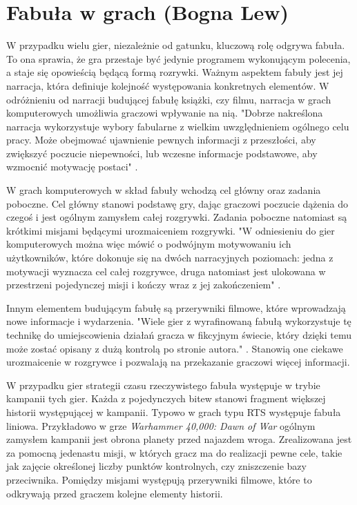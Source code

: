 \section{Fabuła w grach (Bogna Lew)}\label{s:fabula}
W przypadku wielu gier, niezależnie od gatunku, kluczową rolę odgrywa fabuła. To ona sprawia, że gra przestaje być
jedynie programem wykonującym polecenia, a staje się opowieścią będącą formą rozrywki. Ważnym aspektem fabuły jest jej
narracja, która definiuje kolejność występowania konkretnych elementów. W odróżnieniu od narracji budującej
fabułę książki, czy filmu, narracja w grach komputerowych umożliwia graczowi wpływanie na nią. "Dobrze nakreślona
narracja wykorzystuje wybory fabularne z wielkim uwzględnieniem ogólnego celu pracy. Może obejmować ujawnienie pewnych
informacji z przeszłości, aby zwiększyć poczucie niepewności, lub wczesne informacje podstawowe, aby wzmocnić motywację
postaci" \cite{level_design}.

W grach komputerowych w skład fabuły wchodzą cel główny oraz zadania poboczne. Cel główny stanowi podstawę gry, dając
graczowi poczucie dążenia do czegoś i jest ogólnym zamysłem całej rozgrywki. Zadania poboczne natomiast są krótkimi
misjami będącymi urozmaiceniem rozgrywki. "W odniesieniu do gier komputerowych można więc mówić o podwójnym motywowaniu
ich użytkowników, które dokonuje się na dwóch narracyjnych poziomach: jedna z motywacji wyznacza cel całej
rozgrywce, druga natomiast jest ulokowana w przestrzeni pojedynczej misji i kończy wraz z jej zakończeniem" \cite{olbrzymwcieniu}.

Innym elementem budującym fabułę są przerywniki filmowe, które wprowadzają nowe informacje i wydarzenia. "Wiele gier z
wyrafinowaną fabułą wykorzystuje tę technikę do umiejscowienia działań gracza w fikcyjnym świecie, który dzięki temu
może zostać opisany z dużą kontrolą po stronie autora." \cite{understanding_games}. Stanowią one ciekawe urozmaicenie w rozgrywce i
pozwalają na przekazanie graczowi więcej informacji.

W przypadku gier strategii czasu rzeczywistego fabuła występuje w trybie kampanii tych gier. Każda z pojedynczych bitew
stanowi fragment większej historii występującej w kampanii. Typowo w grach typu RTS występuje fabuła liniowa.
Przykładowo w grze \textit{Warhammer 40,000: Dawn of War} ogólnym zamysłem kampanii jest obrona planety przed najazdem wroga.
Zrealizowana jest za pomocną jedenastu misji, w których gracz ma do realizacji pewne cele, takie jak zajęcie określonej
liczby punktów kontrolnych, czy zniszczenie bazy przeciwnika. Pomiędzy misjami występują przerywniki filmowe, które
to odkrywają przed graczem kolejne elementy historii.

